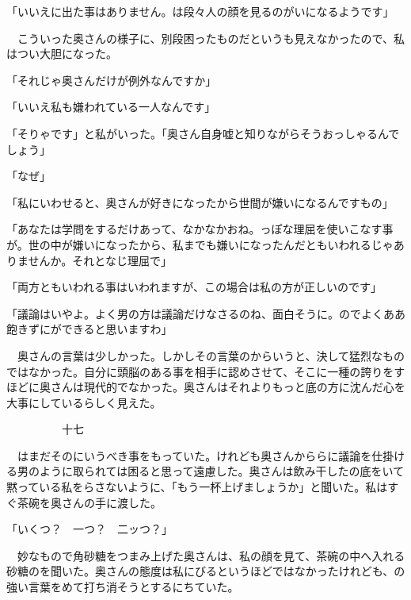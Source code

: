 \documentclass[a4j,onecolumn]{tarticle}
\begin{document}
「いいえに出た事はありません。\hbox{}は段々人の顔を見るのがいになるようです」\par{}
　こういった奥さんの様子に、\hbox{}別段困ったものだというも見えなかったので、\hbox{}私はつい大胆になった。\hbox{}\par{}
「それじゃ奥さんだけが例外なんですか」\par{}
「いいえ私も嫌われている一人なんです」\par{}
「そりゃです」と私がいった。\hbox{}「奥さん自身嘘と知りながらそうおっしゃるんでしょう」\par{}
「なぜ」\par{}
「私にいわせると、\hbox{}奥さんが好きになったから世間が嫌いになるんですもの」\par{}
「あなたは学問をするだけあって、\hbox{}なかなかおね。\hbox{}っぽな理屈を使いこなす事が。\hbox{}世の中が嫌いになったから、\hbox{}私までも嫌いになったんだともいわれるじゃありませんか。\hbox{}それとなじ理屈で」\par{}
「両方ともいわれる事はいわれますが、\hbox{}この場合は私の方が正しいのです」\par{}
「議論はいやよ。\hbox{}よく男の方は議論だけなさるのね、\hbox{}面白そうに。\hbox{}のでよくああ飽きずにができると思いますわ」\par{}
　奥さんの言葉は少しかった。\hbox{}しかしその言葉のからいうと、\hbox{}決して猛烈なものではなかった。\hbox{}自分に頭脳のある事を相手に認めさせて、\hbox{}そこに一種の誇りをすほどに奥さんは現代的でなかった。\hbox{}奥さんはそれよりもっと底の方に沈んだ心を大事にしているらしく見えた。\hbox{}\par{}\par{}　　　　　十七
\par{}
　はまだそのにいうべき事をもっていた。\hbox{}けれども奥さんかららに議論を仕掛ける男のように取られては困ると思って遠慮した。\hbox{}奥さんは飲み干したの底をいて黙っている私をらさないように、\hbox{}「もう一杯上げましょうか」と聞いた。\hbox{}私はすぐ茶碗を奥さんの手に渡した。\hbox{}\par{}
「いくつ？　一つ？　二ッつ？」\par{}
　妙なもので角砂糖をつまみ上げた奥さんは、\hbox{}私の顔を見て、\hbox{}茶碗の中へ入れる砂糖のを聞いた。\hbox{}奥さんの態度は私にびるというほどではなかったけれども、\hbox{}の強い言葉をめて打ち消そうとするにちていた。\hbox{}\par{}
\end{document}
